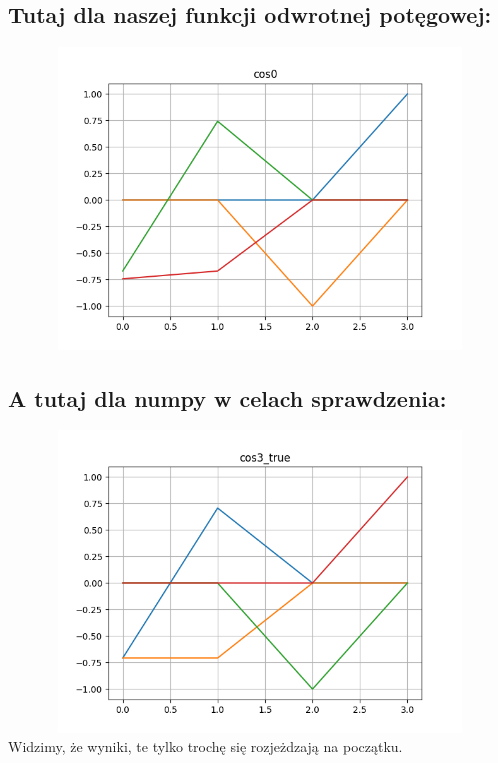 \documentclass[12pt]{article}
\begin{document}
\subsection*{Tutaj dla naszej funkcji odwrotnej potęgowej: }
\includegraphics[width=17cm,height=8cm, keepaspectratio]{Wykres_cos0.png}
\subsection*{A tutaj dla numpy w celach sprawdzenia: }
\includegraphics[width=17cm,height=8cm, keepaspectratio]{Wykres_cos3_true.png}
\newline
Widzimy, że wyniki, te tylko trochę się rozjeżdzają na początku.
\end{document}
